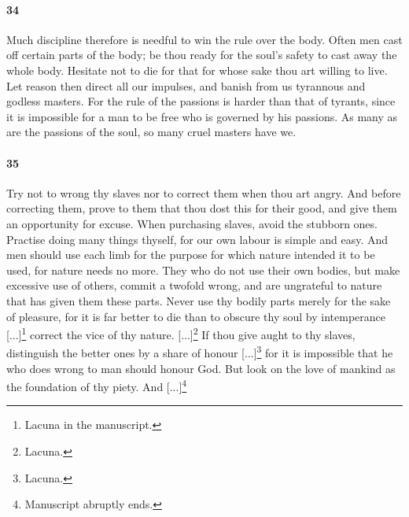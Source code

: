 \documentclass{article}
\begin{document}
\paragraph{34} Much discipline therefore is needful to win the rule over the body. Often men cast off certain parts of the body; be thou ready for the soul's safety to cast away the whole body. Hesitate not to die for that for whose sake thou art willing to live. Let reason then direct all our impulses, and banish from us tyrannous and godless masters. For the rule of the passions is harder than that of tyrants, since it is impossible for a man to be free who is governed by his passions. As many as are the passions of the soul, so many cruel masters have we. 

\paragraph{35} Try not to wrong thy slaves nor to correct them when thou art angry. And before correcting them, prove to them that thou dost this for their good, and give them an opportunity for excuse. When purchasing slaves, avoid the stubborn ones. Practise doing many things thyself, for our own labour is simple and easy. And men should use each limb for the purpose for which nature intended it to be used, for nature needs no more. They who do not use their own bodies, but make excessive use of others, commit a twofold wrong, and are ungrateful to nature that has given them these parts. Never use thy bodily parts merely for the sake of pleasure, for it is far better to die than to obscure thy soul by intemperance [...]\footnote{Lacuna in the manuscript.} correct the vice of thy nature. [...]\footnote{Lacuna.} If thou give aught to thy slaves, distinguish the better ones by a share of honour [...]\footnote{Lacuna.} for it is impossible that he who does wrong to man should honour God. But look on the love of mankind as the foundation of thy piety. And [...]\footnote{Manuscript abruptly ends.}
\end{document}
